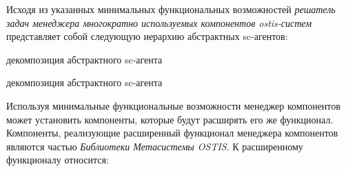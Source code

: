 Исходя из указанных минимальных функциональных возможностей \textit{решатель задач менеджера многократно используемых компонентов ostis-систем} представляет собой следующую иерархию абстрактных sc-агентов:

\begin{SCn}
	\begin{scnrelfromset}{декомпозиция абстрактного sc-агента}
		\begin{scnindent}
			\begin{scnrelfromset}{декомпозиция абстрактного sc-агента}
			\end{scnrelfromset}
		\end{scnindent}
	\end{scnrelfromset}
\end{SCn}

Используя минимальные функциональные возможности менеджер компонентов может установить компоненты, которые будут расширять его же функционал. Компоненты, реализующие расширенный функционал менеджера компонентов являются частью \textit{Библиотеки Метасистемы OSTIS}. К расширенному функционалу относится:

